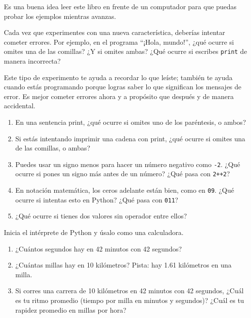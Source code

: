 \documentclass[10pt]{book}
\begin{document}
\begin{exercise}

Es una buena idea leer este libro en frente de un computador para que puedas
probar los ejemplos mientras avanzas.

Cada vez que experimentes con una nueva característica, deberías intentar
cometer errores.  Por ejemplo, en el programa ``¡Hola, mundo!'',
¿qué ocurre si omites una de las comillas?  ¿Y
si omites ambas?  ¿Qué ocurre si escribes {\tt print} de manera incorrecta?

Este tipo de experimento te ayuda a recordar lo que leíste; también
te ayuda cuando estás programando porque logras saber lo que significan los
mensajes de error.  Es mejor cometer errores ahora y a propósito que
después y de manera accidental.

\begin{enumerate}

\item En una sentencia print, ¿qué ocurre si omites uno
de los paréntesis, o ambos?

\item Si estás intentando imprimir una cadena con print, ¿qué ocurre si
omites una de las comillas, o ambas?

\item Puedes usar un signo menos para hacer un número negativo como
{\tt -2}.  ¿Qué ocurre si pones un signo más antes de un número?
¿Qué pasa con {\tt 2++2}?

\item En notación matemática, los ceros adelante están bien, como en {\tt 09}.
¿Qué ocurre si intentas esto en Python?  ¿Qué pasa con {\tt 011}?

\item ¿Qué ocurre si tienes dos valores sin operador
entre ellos?

\end{enumerate}

\end{exercise}



\begin{exercise}

Inicia el intérprete de Python y úsalo como una calculadora.

\begin{enumerate}

\item ¿Cuántos segundos hay en 42 minutos con 42 segundos?

\item ¿Cuántas millas hay en 10 kilómetros?  Pista: hay 1.61
  kilómetros en una milla.

\item Si corres una carrera de 10 kilómetros en 42 minutos con 42 segundos,
  ¿Cuál es tu ritmo promedio (tiempo por milla en minutos y segundos)?  ¿Cuál
  es tu rapidez promedio en millas por hora?


\end{enumerate}

\end{exercise}
\end{document}

